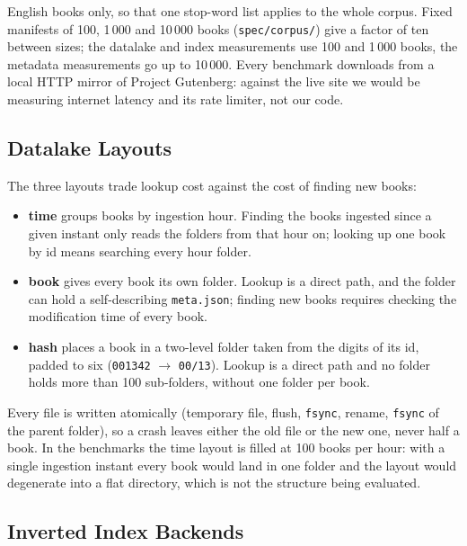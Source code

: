 \documentclass[12pt,a4paper]{article}
\begin{document}
	English books only, so that one stop-word list applies to the whole corpus. Fixed
	manifests of 100, 1\,000 and 10\,000 books (\texttt{spec/corpus/}) give a factor of ten
	between sizes; the datalake and index measurements use 100 and 1\,000 books, the metadata
	measurements go up to 10\,000. Every benchmark downloads from a
	local HTTP mirror of Project Gutenberg: against the live site we would be measuring
	internet latency and its rate limiter, not our code.

	\subsection{Datalake Layouts}

	The three layouts trade lookup cost against the cost of finding new books:
	\begin{itemize}
		\item \textbf{time} groups books by ingestion hour. Finding the books ingested since a
		given instant only reads the folders from that hour on; looking up one book by id
		means searching every hour folder.
		\item \textbf{book} gives every book its own folder. Lookup is a direct path, and the
		folder can hold a self-describing \texttt{meta.json}; finding new books requires
		checking the modification time of every book.
		\item \textbf{hash} places a book in a two-level folder taken from the digits of its
		id, padded to six (\texttt{001342} $\rightarrow$ \texttt{00/13}). Lookup is a direct
		path and no folder holds more than 100 sub-folders, without one folder per book.
	\end{itemize}

	Every file is written atomically (temporary file, flush, \texttt{fsync}, rename,
	\texttt{fsync} of the parent folder), so a crash leaves either the old file or the new
	one, never half a book. In the benchmarks the time layout is filled at 100 books per
	hour: with a single ingestion instant every book would land in one folder and the layout
	would degenerate into a flat directory, which is not the structure being evaluated.

	\subsection{Inverted Index Backends}
\end{document}
